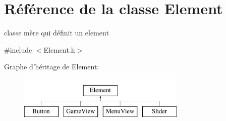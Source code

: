 \hypertarget{classElement}{
\section{Référence de la classe Element}
\label{classElement}
}


classe mère qui définit un element  




{\ttfamily \#include $<$Element.h$>$}

Graphe d'héritage de Element:\begin{figure}[H]
\begin{center}
\leavevmode
\includegraphics[height=2.000000cm]{classElement}
\end{center}
\end{figure}
